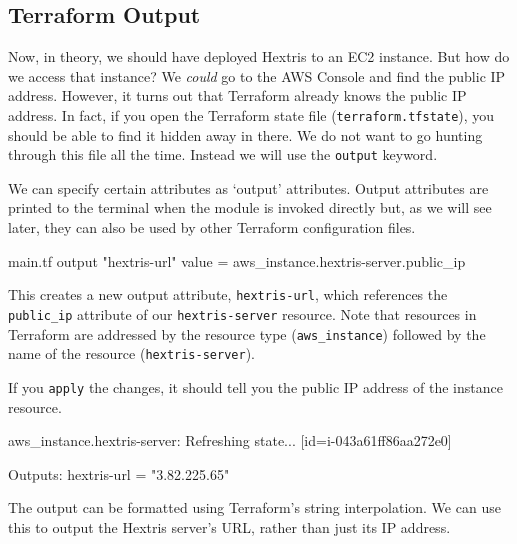\documentclass{csse4400}
\begin{document}
\subsection{Terraform Output}

Now, in theory, we should have deployed Hextris to an EC2 instance.
But how do we access that instance?
We \textit{could} go to the AWS Console and find the public IP address.
However, it turns out that Terraform already knows the public IP address.
In fact, if you open the Terraform state file (\texttt{terraform.tfstate}),
you should be able to find it hidden away in there.
We do not want to go hunting through this file all the time.
Instead we will use the \texttt{output} keyword.

We can specify certain attributes as `output' attributes.
Output attributes are printed to the terminal when the module is invoked directly but,
as we will see later, they can also be used by other Terraform configuration files.

\vspace{-1em}
\begin{code}[language=terraform,numbers=none]{main.tf}
output "hextris-url" {
  value = aws_instance.hextris-server.public_ip
}
\end{code}

This creates a new output attribute, \texttt{hextris-url},
which references the \texttt{public\_ip} attribute of our \texttt{hextris-server} resource.
Note that resources in Terraform are addressed by the resource type (\texttt{aws\_instance})
followed by the name of the resource (\texttt{hextris-server}).

If you \texttt{apply} the changes, it should tell you the public IP address of the instance resource.

\begin{code}[numbers=none]{}
aws_instance.hextris-server: Refreshing state... [id=i-043a61ff86aa272e0]

Outputs:
hextris-url = "3.82.225.65"
\end{code}

The output can be formatted using Terraform's string interpolation.
We can use this to output the Hextris server's URL, rather than just its IP address.

\vspace{-1em}
\end{document}
